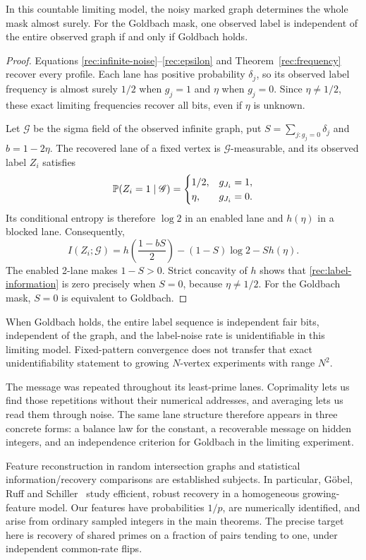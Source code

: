 \begin{proposition}\label{rec:infinite-message}
In this countable limiting model, the noisy marked graph determines
the whole mask almost surely. For the Goldbach mask, one observed
label is independent of the entire observed graph if and only if
Goldbach holds.
\end{proposition}
\begin{proof}
Equations \eqref{rec:infinite-noise}--\eqref{rec:epsilon} and
Theorem~\ref{rec:frequency} recover every profile. Each lane has
positive probability $\delta_j$, so its observed label frequency is
almost surely $1/2$ when $g_j=1$ and $\eta$ when $g_j=0$.
Since $\eta\ne1/2$, these exact limiting frequencies recover all bits,
even if $\eta$ is unknown.

Let $\mathscr G$ be the sigma field of the observed infinite graph,
put $S=\sum_{j:g_j=0}\delta_j$ and $b=1-2\eta$. The recovered lane
of a fixed vertex is $\mathscr G$-measurable, and its observed label
$Z_i$ satisfies
\[
 \mathbb P(Z_i=1\mid\mathscr G)=
 \begin{cases}
  1/2,&g_{J_i}=1,\\
  \eta,&g_{J_i}=0.
 \end{cases}
\]
Its conditional entropy is therefore $\log2$ in an enabled lane and
$h(\eta)$ in a blocked lane. Consequently,
\begin{equation}\label{rec:label-information}
 I(Z_i;\mathscr G)
 =h\left(\frac{1-bS}{2}\right)
  -(1-S)\log2-S h(\eta).
\end{equation}
The enabled 2-lane makes $1-S>0$. Strict concavity of $h$ shows that
\eqref{rec:label-information} is zero precisely when $S=0$, because
$\eta\ne1/2$. For the Goldbach mask, $S=0$ is equivalent to Goldbach.
\end{proof}

When Goldbach holds, the entire label sequence is independent fair
bits, independent of the graph, and the label-noise rate is
unidentifiable in this limiting model. Fixed-pattern convergence does
not transfer that exact unidentifiability statement to growing
$N$-vertex experiments with range $N^2$.

The message was repeated throughout its least-prime lanes. Coprimality
lets us find those repetitions without their numerical addresses, and
averaging lets us read them through noise. The same lane structure
therefore appears in three concrete forms: a balance law for the
constant, a recoverable message on hidden integers, and an independence
criterion for Goldbach in the limiting experiment.

\begin{remark}
Feature reconstruction in random intersection graphs and statistical
information/recovery comparisons are established subjects. In
particular, Göbel, Ruff and Schiller~\cite{RecGobelRuffSchiller2026}
study efficient, robust recovery in a homogeneous growing-feature
model. Our features have probabilities $1/p$, are numerically
identified, and arise from ordinary sampled integers in the main
theorems. The precise target here is recovery of shared primes on a
fraction of pairs tending to one, under independent common-rate flips.
\end{remark}
